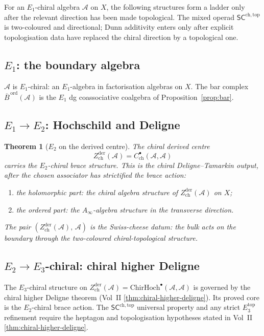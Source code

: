 \documentclass[11pt]{article}
\newtheorem{theorem}{Theorem}[section]
\theoremstyle{remark}
\providecommand{\cA}{\mathcal{A}}
\providecommand{\ChirHoch}{\mathrm{ChirHoch}}
\providecommand{\Ainf}{A_\infty}
\providecommand{\SCchtop}{\mathsf{SC}^{\mathrm{ch},\mathrm{top}}}
\providecommand{\Bord}{\overline{B}^{\,\mathrm{ord}}}
\begin{document}
For an $E_1$-chiral algebra $\cA$ on $X$, the following structures form
a ladder only after the relevant direction has been made topological.
The mixed operad $\SCchtop$ is two-coloured and directional; Dunn
additivity enters only after explicit topologisation data have replaced
the chiral direction by a topological one.

\subsection*{$E_1$: the boundary algebra}

$\cA$ is $E_1$-chiral: an $E_1$-algebra in factorisation algebras
on $X$.  The bar complex $\Bord(\cA)$ is the $E_1$ dg coassociative
coalgebra of Proposition~\ref{prop:bar}.

\subsection*{$E_1 \to E_2$: Hochschild and Deligne}

\begin{theorem}[$E_2$ on the derived centre]\label{thm:e2}
The chiral derived centre
\[
Z^{\mathrm{der}}_{\mathrm{ch}}(\cA) = C^\bullet_{\mathrm{ch}}(\cA,\cA)
\]
carries the $E_2$-chiral brace structure.  This is the chiral
Deligne--Tamarkin output, after the chosen associator has strictified
the brace action:
\begin{enumerate}[label=\textup{(\alph*)}]
\item the holomorphic part: the chiral algebra structure of
  $Z^{\mathrm{der}}_{\mathrm{ch}}(\cA)$ on $X$;
\item the ordered part: the $\Ainf$-algebra structure in the
  transverse direction.
\end{enumerate}
The pair $(Z^{\mathrm{der}}_{\mathrm{ch}}(\cA),\, \cA)$ is the
Swiss-cheese datum: the bulk acts on the boundary through the
two-coloured chiral-topological structure.
\end{theorem}

\subsection*{$E_2 \to E_3$-chiral: chiral higher Deligne}

The $E_3$-chiral structure on
$Z^{\mathrm{der}}_{\mathrm{ch}}(\cA) = \ChirHoch^\bullet(\cA, \cA)$
is governed by the chiral higher Deligne theorem
(Vol~II \ref*{thm:chiral-higher-deligne}).  Its proved core is the
$E_2$-chiral brace action.  The $\SCchtop$ universal property and any
strict $E_3^{\mathrm{top}}$ refinement require the heptagon and
topologisation hypotheses stated in Vol~II
\ref*{thm:chiral-higher-deligne}.
\end{document}

